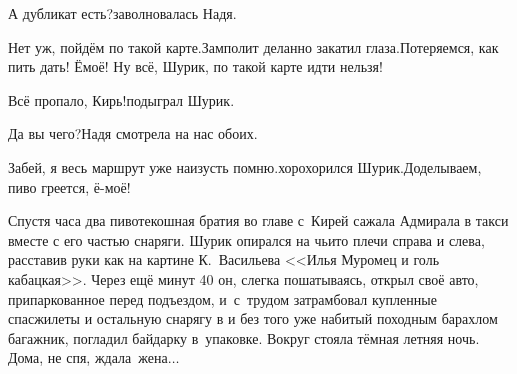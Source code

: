 \diagdash А дубликат есть?\mdash заволновалась Надя.

\diagdash Нет уж, пойдём по такой карте.\mdash Замполит деланно закатил глаза.\mdash Потеряемся, как пить дать! Ё\sdash моё! Ну всё, Шурик, по такой карте идти нельзя! 

\diagdash Всё пропало, Кирь!\mdash подыграл Шурик.

\diagdash Да вы чего?\mdash Надя смотрела на нас обоих.

\diagdash Забей, я весь маршрут уже наизусть помню.\mdash хорохорился Шурик.\mdash Доделываем, пиво греется, ё-моё!

Спустя часа два пивотекошная братия во главе с~Кирей сажала Адмирала в такси вместе с его частью снаряги. Шурик опирался на чьи\sdash то плечи справа и слева, расставив руки как на картине К.~Васильева <<Илья Муромец и голь кабацкая>>. Через ещё минут 40 он, слегка пошатываясь, открыл своё авто, припаркованное перед подъездом, и~с~трудом затрамбовал купленные спасжилеты и остальную снарягу в и без того уже набитый походным барахлом багажник, погладил байдарку в~упаковке. Вокруг стояла тёмная летняя ночь. Дома, не спя, ждала~жена$\ldots$

\begin{center}
\end{center}
